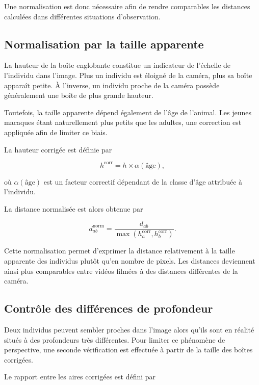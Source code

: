 \documentclass[11pt,a4paper]{report}
\begin{document}
Une normalisation est donc nécessaire afin de rendre comparables les distances
calculées dans différentes situations d'observation.

\subsection*{Normalisation par la taille apparente}

La hauteur de la boîte englobante constitue un indicateur de l'échelle de
l'individu dans l'image. Plus un individu est éloigné de la caméra, plus sa
boîte apparaît petite. À l'inverse, un individu proche de la caméra possède
généralement une boîte de plus grande hauteur.

Toutefois, la taille apparente dépend également de l'âge de l'animal. Les jeunes
macaques étant naturellement plus petits que les adultes, une correction est
appliquée afin de limiter ce biais.

La hauteur corrigée est définie par

\begin{equation}
h^{\mathrm{corr}}
=
h\times\alpha(\text{âge}),
\end{equation}

où $\alpha(\text{âge})$ est un facteur correctif dépendant de la classe d'âge
attribuée à l'individu.

La distance normalisée est alors obtenue par

\begin{equation}
d_{ab}^{\mathrm{norm}}
=
\frac{d_{ab}}
{\max\left(h_a^{\mathrm{corr}},
h_b^{\mathrm{corr}}\right)}.
\end{equation}

Cette normalisation permet d'exprimer la distance relativement à la taille
apparente des individus plutôt qu'en nombre de pixels. Les distances deviennent
ainsi plus comparables entre vidéos filmées à des distances différentes de la
caméra.

\subsection*{Contrôle des différences de profondeur}

Deux individus peuvent sembler proches dans l'image alors qu'ils sont en réalité
situés à des profondeurs très différentes. Pour limiter ce phénomène de
perspective, une seconde vérification est effectuée à partir de la taille des
boîtes corrigées.

Le rapport entre les aires corrigées est défini par
\end{document}
